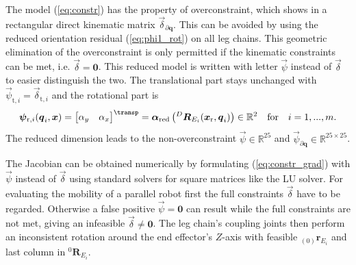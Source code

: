 \documentclass[
	graybox,
	vecphys] %
	{svmult}
\newcommand{\bm}[1]{\boldsymbol{#1}}
\newcommand{\ortvek}[4]{{ }_{(#1)}{\boldsymbol{#2}}^{#3}_{#4} }
\newcommand{\vek}[3]{\boldsymbol{#1}^{#2}_{#3}}
\newcommand{\trmat}[2]{{{ }^{#1}\boldsymbol{T}}_{#2}}
\newcommand{\rotmat}[2]{{{ }^{#1}\boldsymbol{R}}_{#2}}
\newcommand{\Res}[0]{\vec{\delta}}
\newcommand{\ResR}[0]{\vec{\psi}}
\begin{document}
The model (\ref{eq:constr}) has the property of overconstraint, which shows in a rectangular direct kinematic matrix $\Res_{\partial \bm{q}}$.
This can be avoided by using the reduced orientation residual (\ref{eq:phi1_rot}) on all leg chains.
This geometric elimination of the overconstraint is only permitted if the kinematic constraints can be met, i.e. $\Res{=}\bm{0}$.
This reduced model is written with letter $\ResR$ instead of $\Res$ to easier distinguish the two.
The translational part stays unchanged with $\ResR_{\mathrm{t},i}=\Res_{\mathrm{t},i}$  and the rotational part is
\vspace{-0.15cm}
\begin{equation}
\ResR_{\mathrm{r},i}(\bm{q}_i,\bm{x})
=
\begin{bmatrix}
\alpha_y & \alpha_x
\end{bmatrix}^\transp
=
\bm{\alpha}_\mathrm{red}\left(\rotmat{D}{E_i}(\bm{x}_{\mathrm{r}},\bm{q}_i)\right) \in \mathbb{R}^2
\quad \mathrm{for} \quad i=1,...,m.
\label{eq:constr_rot_red}
\end{equation}
\vspace{-0.15cm}
The reduced dimension leads to the non-overconstraint $\ResR \in \mathbb{R}^{25}$ and $\ResR_{\partial \bm{q}} \in \mathbb{R}^{25 \times 25}$. %

The Jacobian can be obtained numerically by formulating (\ref{eq:constr_grad}) with $\ResR$ instead of $\Res$ using standard solvers for square matrices like the LU solver.
%
For evaluating the mobility of a parallel robot first the full constraints $\Res$ have to be regarded.
Otherwise a false positive $\ResR{=}\bm{0}$ can result while the full constraints are not met, giving an infeasible $\Res{\ne}\bm{0}$. %
The leg chain's coupling joints then perform an inconsistent rotation around the end effector's $Z$-axis with feasible $\ortvek{0}{r}{}{E_i}$ and last column in $\rotmat{0}{E_i}$.
\end{document}
